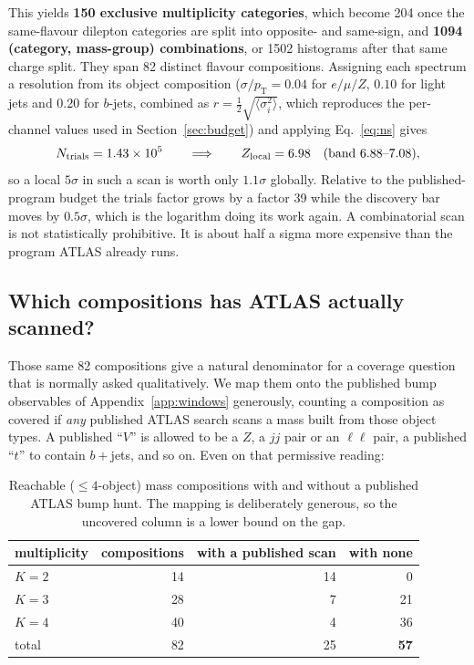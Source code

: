 This yields \textbf{150 exclusive multiplicity categories}, which become 204 once the
same-flavour dilepton categories are split into opposite- and same-sign, and \textbf{1094
(category, mass-group) combinations}, or 1502 histograms after that same charge split. They span 82
distinct flavour compositions. Assigning each spectrum a resolution from its object
composition ($\sigma/p_{\mathrm{T}} = 0.04$ for $e/\mu/Z$, $0.10$ for light jets and $0.20$ for
$b$-jets, combined as $r = \tfrac12\sqrt{\langle \sigma_i^2\rangle}$, which reproduces the
per-channel values used in Section~\ref{sec:budget}) and applying Eq.~\eqref{eq:ns} gives
\begin{equation*}
  N_{\mathrm{trials}} = 1.43\times10^{5}
  \qquad\Longrightarrow\qquad
  Z_{\mathrm{local}} = 6.98 \quad (\text{band } 6.88\text{--}7.08),
\end{equation*}
so a local $5\sigma$ in such a scan is worth only $1.1\sigma$ globally. Relative to the
published-program budget the trials factor grows by a factor 39 while the discovery bar moves by
$0.5\sigma$, which is the logarithm doing its work again. A combinatorial scan is not statistically
prohibitive. It is about half a sigma more expensive than the program ATLAS already runs.

\subsection{Which compositions has ATLAS actually scanned?}

Those same 82 compositions give a natural denominator for a coverage question that is normally
asked qualitatively. We map them onto the published bump observables of Appendix~\ref{app:windows}
generously, counting a composition as covered if \emph{any} published ATLAS search scans a mass
built from those object types. A published ``$V$'' is allowed to be a $Z$, a $jj$ pair or an
$\ell\ell$ pair, a published ``$t$'' to contain $b+$jets, and so on. Even on that permissive
reading:

\begin{table}[htbp]
\centering
\caption{Reachable ($\le4$-object) mass compositions with and without a published ATLAS bump hunt.
The mapping is deliberately generous, so the uncovered column is a lower bound on the gap.}
\label{tab:compgap}
\begin{tabular}{lrrr}
\toprule
multiplicity & compositions & with a published scan & with none \\
\midrule
$K=2$ & 14 & 14 & 0 \\
$K=3$ & 28 & 7 & 21 \\
$K=4$ & 40 & 4 & 36 \\
\midrule
total & 82 & 25 & \textbf{57} \\
\bottomrule
\end{tabular}
\end{table}

